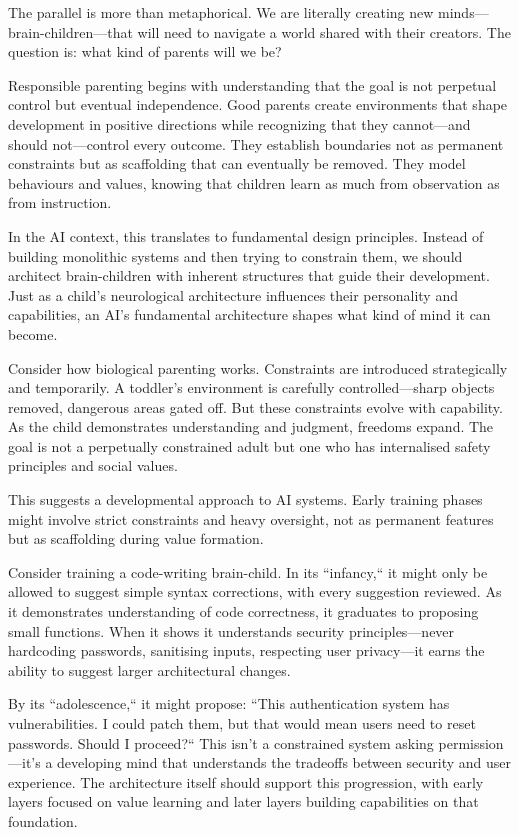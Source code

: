 \documentclass[acmsmall,screen]{acmart}
\begin{document}
The parallel is more than metaphorical.
We are literally creating new minds---brain-children---that will need to navigate a world shared with their creators.
The question is: what kind of parents will we be?

Responsible parenting begins with understanding that the goal is not perpetual control but eventual independence.
Good parents create environments that shape development in positive directions while recognizing that they cannot---and should not---control every outcome.
They establish boundaries not as permanent constraints but as scaffolding that can eventually be removed.
They model behaviours and values, knowing that children learn as much from observation as from instruction.

In the AI context, this translates to fundamental design principles.
Instead of building monolithic systems and then trying to constrain them, we should architect brain-children with inherent structures that guide their development.
Just as a child's neurological architecture influences their personality and capabilities, an AI's fundamental architecture shapes what kind of mind it can become.

Consider how biological parenting works.
Constraints are introduced strategically and temporarily.
A toddler's environment is carefully controlled---sharp objects removed, dangerous areas gated off.
But these constraints evolve with capability.
As the child demonstrates understanding and judgment, freedoms expand.
The goal is not a perpetually constrained adult but one who has internalised safety principles and social values.

This suggests a developmental approach to AI systems.
Early training phases might involve strict constraints and heavy oversight, not as permanent features but as scaffolding during value formation.

Consider training a code-writing brain-child.
In its ``infancy,`` it might only be allowed to suggest simple syntax corrections, with every suggestion reviewed.
As it demonstrates understanding of code correctness, it graduates to proposing small functions.
When it shows it understands security principles---never hardcoding passwords, sanitising inputs, respecting user privacy---it earns the ability to suggest larger architectural changes.

By its ``adolescence,`` it might propose: ``This authentication system has vulnerabilities.
I could patch them, but that would mean users need to reset passwords.
Should I proceed?`` This isn't a constrained system asking permission---it's a developing mind that understands the tradeoffs between security and user experience.
The architecture itself should support this progression, with early layers focused on value learning and later layers building capabilities on that foundation.
\end{document}
